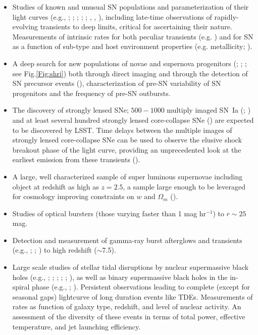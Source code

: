 \begin{itemize}
\item Studies of known and unusual SN populations and parameterization of their light curves (e.g., \cite{Hoeflich1998};
 \cite{Wang2003}; \cite{Howell2007}; \cite{Kowalski2008}; \cite{Hicken2009}; \cite{Foley2012}, \cite{Bianco2014},
 \cite{Arcavi2017}), including late-time observations of rapidly-evolving transients to deep limits, critical for ascertaining their nature. Measurements of intrinsic rates for both peculiar transients (e.g. \cite{Drout2014}) and for SN as a function of sub-type and host environment properties (e.g. metallicity; \cite{Graur2017}).

\item A deep search for new populations of novae and supernova progenitors
      (\cite{Smartt2009}; \cite{Thompson2009}; \cite{Smith2011}; see Fig.\ref{Fig:shri}) both through direct imaging and through the detection of SN precursor events (\cite{Ofek2013}), characterization of pre-SN variability of SN progenitors and the frequency of pre-SN outbursts.

\item The discovery of strongly lensed SNe; $500-1000$ multiply imaged SN~Ia (\cite{Goldstein2017a};
\cite{Goldstein2017b}) and at least several hundred strongly lensed core-collapse SNe (\cite{Oguri2010})
are expected to be discovered by LSST. Time delays between the multiple images of strongly lensed core-collapse
SNe can be used to observe the elusive shock breakout phase of the light curve, providing an unprecedented look
at the earliest emission from these transients (\cite{Suwa2017}).

\item A large, well characterized sample of super luminous supernovae
including object at redshift as high as $z=2.5$, a sample large enough to be leveraged for cosmology  improving constraints on $w$ and $\Omega_m$ (\cite{Scovacricchi2015}).

\item Studies of optical bursters (those varying faster than 1 mag hr$^{-1}$) to $r\sim25$ mag.

\item Detection and measurement of gamma-ray burst afterglows and transients
      (e.g., \cite{Zhang2004}; \cite{Zhang2006}; \cite{Kann2010}) to high redshift ($\sim$7.5).

\item Large scale studies of stellar tidal disruptions by nuclear supermassive
  black holes (e.g., \cite{Evans1989}; \cite{Gezari2008}; \cite{Strubbe2009};
  \cite{Bloom2011}; \cite{Gezari2012a}; \cite{Komossa2015}), as well as binary
  supermassive black holes in the in-spiral phase (e.g., \cite{Cuadra2009};
  \cite{Coughlin2017}). Persistent observations leading to complete (except for
  seasonal gaps) lightcurve of long duration events like
  TDEs. Measurements of rates as function of galaxy type, redshift,
  and level of nuclear activity. An assessment of the diversity
  of these events in terms of total power, effective temperature, and
  jet launching efficiency.



\end{itemize}
